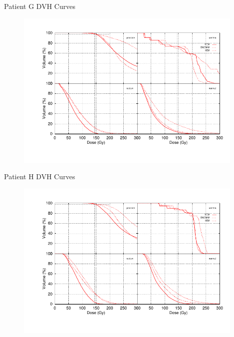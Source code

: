 \documentclass{beamer}
\begin{document}
\begin{frame}{Patient G DVH Curves}
  
  \begin{figure}[h!]
    \begin{center}
      \includegraphics[width=4.3in]{figures/jkahle-all4x4.pdf}
    \end{center}
  \end{figure}

\end{frame}

\begin{frame}{Patient H DVH Curves}
  
  \begin{figure}[h!]
    \begin{center}
      \includegraphics[width=4.3in]{figures/kahle-all4x4.pdf}
    \end{center}
  \end{figure}

\end{frame}
\end{document}
